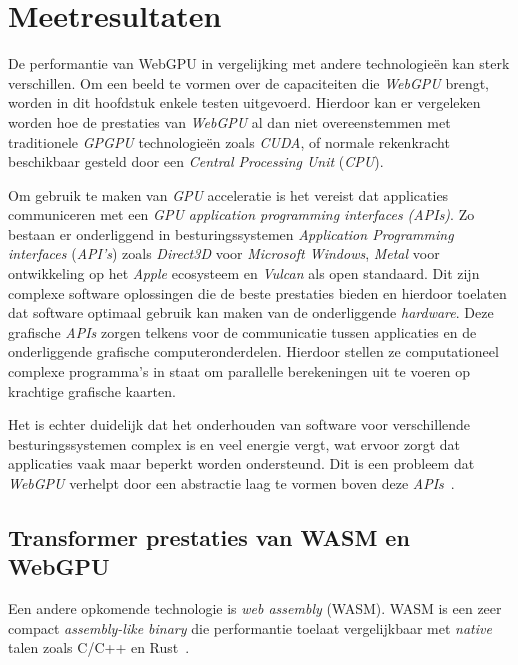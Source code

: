 \chapter{Meetresultaten}%
\label{ch:benchmarks}

De performantie van WebGPU in vergelijking met andere technologieën kan sterk verschillen. Om een beeld te vormen over de capaciteiten die \textit{WebGPU} brengt, worden in dit hoofdstuk enkele testen uitgevoerd. Hierdoor kan er vergeleken worden hoe de prestaties van \textit{WebGPU} al dan niet overeenstemmen met traditionele \textit{GPGPU} technologieën zoals \textit{CUDA}, of normale rekenkracht beschikbaar gesteld door een \textit{Central Processing Unit} (\textit{CPU}).

\bigbreak{}

Om gebruik te maken van \textit{GPU} acceleratie is het vereist dat applicaties communiceren met een \textit{GPU application programming interfaces (APIs)}. Zo bestaan er onderliggend in besturingssystemen \textit{Application Programming interfaces} (\textit{API's}) zoals \textit{Direct3D} voor \textit{Microsoft Windows}, \textit{Metal} voor ontwikkeling op het \textit{Apple} ecosysteem en \textit{Vulcan} als open standaard. Dit zijn complexe software oplossingen die de beste prestaties bieden en hierdoor toelaten dat software optimaal gebruik kan maken van de onderliggende \textit{hardware}. Deze grafische \textit{APIs} zorgen telkens voor de communicatie tussen applicaties en de onderliggende grafische computeronderdelen. Hierdoor stellen ze computationeel complexe programma's in staat om parallelle berekeningen uit te voeren op krachtige grafische kaarten.

\bigbreak{}

Het is echter duidelijk dat het onderhouden van software voor verschillende besturingssystemen complex is en veel energie vergt, wat ervoor zorgt dat applicaties vaak maar beperkt worden ondersteund. Dit is een probleem dat \textit{WebGPU} verhelpt door een abstractie laag te vormen boven deze \textit{APIs}~\autocite{Wallez2023}.

\break{}

\section{Transformer prestaties van WASM en WebGPU}

Een andere opkomende technologie is  \textit{web assembly} (WASM). WASM is een zeer compact \textit{assembly-like binary} die performantie toelaat vergelijkbaar met \textit{native} talen zoals C/C++ en Rust~\autocite{Steiner2023}.

